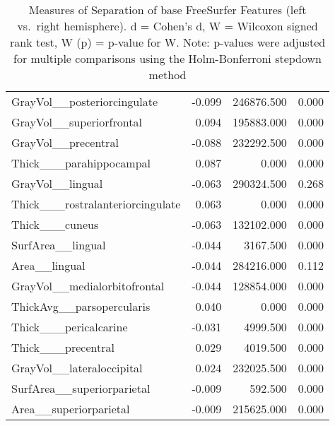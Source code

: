 \documentclass{article}
\begin{document}
\begin{table}
\begin{tabular}{lrrr}
	GrayVol\_\_posteriorcingulate & -0.099 & 246876.500 & 0.000 \\
	GrayVol\_\_superiorfrontal & 0.094 & 195883.000 & 0.000 \\
	GrayVol\_\_precentral & -0.088 & 232292.500 & 0.000 \\
	Thick\_\_\_parahippocampal & 0.087 & 0.000 & 0.000 \\
	GrayVol\_\_lingual & -0.063 & 290324.500 & 0.268 \\
	Thick\_\_\_rostralanteriorcingulate & 0.063 & 0.000 & 0.000 \\
	Thick\_\_\_cuneus & -0.063 & 132102.000 & 0.000 \\
	SurfArea\_\_lingual & -0.044 & 3167.500 & 0.000 \\
	Area\_\_lingual & -0.044 & 284216.000 & 0.112 \\
	GrayVol\_\_medialorbitofrontal & -0.044 & 128854.000 & 0.000 \\
	ThickAvg\_\_parsopercularis & 0.040 & 0.000 & 0.000 \\
	Thick\_\_\_pericalcarine & -0.031 & 4999.500 & 0.000 \\
	Thick\_\_\_precentral & 0.029 & 4019.500 & 0.000 \\
	GrayVol\_\_lateraloccipital & 0.024 & 232025.500 & 0.000 \\
	SurfArea\_\_superiorparietal & -0.009 & 592.500 & 0.000 \\
	Area\_\_superiorparietal & -0.009 & 215625.000 & 0.000 \\
	\bottomrule
\end{tabular}
\footnotesize
\caption{Measures of Separation of base FreeSurfer Features (left vs.\ right
hemisphere). d = Cohen's d, W = Wilcoxon signed rank test, W (p) = p-value
for W. Note: p-values were adjusted for multiple comparisons using the
Holm-Bonferroni stepdown method
}
\normalsize
\label{tab:lateral-fs}
\end{table}
\end{document}
